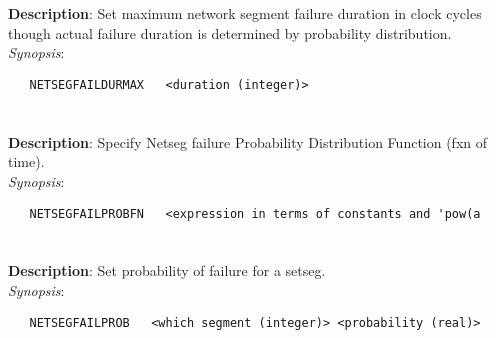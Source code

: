 \section{\quad{}}
\label{manpages:NETSEGFAILDURMAX}
\label{manpages:netsegfaildurmax}
\vspace{-0.1in}
{\bf Description}: 	Set maximum network segment failure duration in clock cycles though actual failure duration is determined by probability distribution.\\[1.5ex]
{\em Synopsis}:
\vspace{-0.05in}
\scriptsize
\begin{lstlisting}
   NETSEGFAILDURMAX   <duration (integer)>						
\end{lstlisting}
\normalsize
\vspace{-0.05in}


\section{\quad{}}
\label{manpages:NETSEGFAILPROBFN}
\label{manpages:netsegfailprobfn}
\vspace{-0.1in}
{\bf Description}: 	Specify Netseg failure Probability Distribution Function (fxn of time).\\[1.5ex]
{\em Synopsis}:
\vspace{-0.05in}
\scriptsize
\begin{lstlisting}
   NETSEGFAILPROBFN   <expression in terms of constants and 'pow(a
\end{lstlisting}
\normalsize
\vspace{-0.05in}


\section{\quad{}}
\label{manpages:NETSEGFAILPROB}
\label{manpages:netsegfailprob}
\vspace{-0.1in}
{\bf Description}: 	Set probability of failure for a setseg.\\[1.5ex]
{\em Synopsis}:
\vspace{-0.05in}
\scriptsize
\begin{lstlisting}
   NETSEGFAILPROB   <which segment (integer)> <probability (real)>															
\end{lstlisting}
\normalsize
\vspace{-0.05in}


